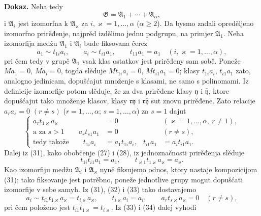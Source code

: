 \documentclass[11pt]{article}
\begin{document}
\textbf{Dokaz.} Neha tedy
\[
  \mathfrak G=\mathfrak A_1+\cdots+\mathfrak A_\alpha,
\]
i \(\mathfrak A_i\) jest izomorfna k \(\mathfrak A_\varkappa\) za \(i,\varkappa=1,\ldots,\alpha\) (\(\alpha\ge2\)). Da bysmo zadali opreděljeno izomorfno prirěđenje, najprěd izdělimo jednu podgrupu, na primjer \(\mathfrak A_1\). Neha izomorfija medžu \(\mathfrak A_1\) i \(\mathfrak A_i\) bude fiksovana čerez
\begin{equation}
 a_1\sim t_{1i}a_i,\qquad a_i\sim t_{i1}a_1,\qquad t_{11}a_1=a_1
 \quad (i,\varkappa=1,\ldots,\alpha),
\tag{31}
\end{equation}
pri čem tedy v grupě \(\mathfrak A_1\) vsak klas ostatkov jest prirěđeny sam sobě. Poneže \(Ma_1=0\), \(Ma_i=0\), togda slěduje \(Mt_{1i}a_i=0\), \(Mt_{i1}a_1=0\); klasy \(t_{1i}a_i\), \(t_{i1}a_1\) zato, analogno jedinicam, dopušćajut množenje s klasami, ne samo s polinomami. Iz definicije izomorfije potom slěduje, že za dva prirěđene klasy \(\mathfrak y\) i \(\bar{\mathfrak y}\), ktore dopušćajut tako množenje klasov, klasy \(\mathfrak r\mathfrak y\) i \(\mathfrak r\bar{\mathfrak y}\) sut znovu prirěđene. Zato relacije \(a_ra_s=0\) \((r\ne s)\) (\(r=1,\ldots,\alpha\); \(s=1,
\ldots,\alpha\)) za \(s=1\) dajut
\begin{equation}
\left\{
\begin{aligned}
 a_r t_{1\varkappa}a_\varkappa&=0 &&(\varkappa=1,
\ldots,\alpha,
\ r\ne1),\\
 \text{a za }s>1\qquad a_r t_{s1}a_1&=0 &&(r\ne s),\\
 \text{tedy takože}\qquad t_{1i}a_i&=a_1t_{1i}a_i,
 & t_{i1}a_1&=a_it_{i1}a_1.
\end{aligned}\right.
\tag{32}
\end{equation}
Dalej iz (31), kako obobčenje (27) i (28), iz jednoznačnosti prirěđenja slěduje
\begin{equation}
 t_{1i}t_{i1}a_1=a_1,
 \qquad
 t_{\varkappa1}t_{1\varkappa}a_\varkappa=a_\varkappa.
\tag{33}
\end{equation}
Kao izomorfiju medžu \(\mathfrak A_i\) i \(\mathfrak A_\varkappa\) nyně fiksujemo odnos, ktory nastaje kompozicijom (31); tako fiksovanje jest potrěbno, poneže jednotlive grupy mogut dopušćati izomorfije v sebe samyh. Iz (31), (32) i (33) tako dostavajemo
\begin{equation}
 a_i\sim t_{i1}t_{1\varkappa}a_\varkappa=t_{i\varkappa}a_\varkappa,
 \qquad
 t_{i\varkappa}a_i=a_i,
 \qquad
 a_rt_{s\varkappa}a_\varkappa=0\quad (r\ne s),
\tag{34}
\end{equation}
pri čem položeno jest \(t_{i1}t_{1\varkappa}=t_{i\varkappa}\). Iz (33) i (34) dalej vyhodi
\end{document}
